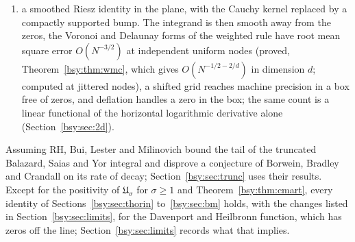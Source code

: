\begin{enumerate}
\item a smoothed Riesz identity in the plane, with the Cauchy kernel replaced by a compactly supported bump. The integrand is then smooth away from the zeros, the Voronoi and Delaunay forms of the weighted rule have root mean square error $O(N^{-3/2})$ at independent uniform nodes (proved, Theorem~\ref{bsy:thm:wmc}, which gives $O(N^{-1/2-2/d})$ in dimension $d$; computed at jittered nodes), a shifted grid reaches machine precision in a box free of zeros, and deflation handles a zero in the box; the same count is a linear functional of the horizontal logarithmic derivative alone (Section~\ref{bsy:sec:2d}).
\end{enumerate}
Assuming RH, Bui, Lester and Milinovich \cite{BLM14} bound the tail of the truncated Balazard, Saias and Yor integral and disprove a conjecture of Borwein, Bradley and Crandall \cite{BBC00} on its rate of decay; Section~\ref{bsy:sec:trunc} uses their results. Except for the positivity of $\mathfrak U_\sigma$ for $\sigma\ge1$ and Theorem~\ref{bsy:thm:cmart}, every identity of Sections~\ref{bsy:sec:thorin} to~\ref{bsy:sec:bm} holds, with the changes listed in Section~\ref{bsy:sec:limits}, for the Davenport and Heilbronn function, which has zeros off the line; Section~\ref{bsy:sec:limits} records what that implies.

